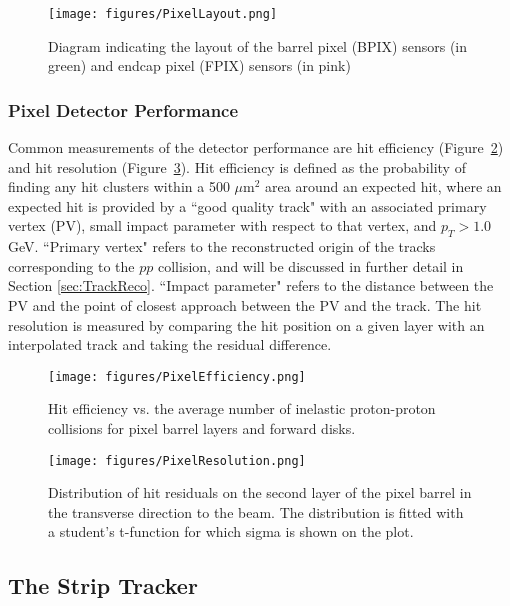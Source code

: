 \begin{figure}\centering
  \texttt{[image: figures/PixelLayout.png]}
  \caption{\label{fig:PixelLayout} Diagram indicating the layout of the barrel pixel (BPIX) sensors (in green) and endcap pixel (FPIX) sensors (in pink)}
\end{figure}

\subsubsection{Pixel Detector Performance}

Common measurements of the detector performance are hit efficiency (Figure~\ref{fig:PixelEfficiency}) and hit resolution (Figure~\ref{fig:PixelResolution}). Hit efficiency is defined as the probability of finding any hit clusters within a 500 $\mu$m$^2$ area around an expected hit, where an expected hit is provided by a ``good quality track" with an associated primary vertex (PV), small impact parameter with respect to that vertex, and $p_{T} > 1.0$ GeV. ``Primary vertex" refers to the reconstructed origin of the tracks corresponding to the $pp$ collision, and will be discussed in further detail in Section \ref{sec:TrackReco}. ``Impact parameter" refers to the distance between the PV and the point of closest approach between the PV and the track. The hit resolution is measured by comparing the hit position on a given layer with an interpolated track and taking the residual difference.\cite{PixelPerformance}

\begin{figure}\centering
  \texttt{[image: figures/PixelEfficiency.png]}
  \caption{\label{fig:PixelEfficiency} Hit efficiency vs. the average number of inelastic proton-proton collisions for pixel barrel layers and forward disks.}
\end{figure}

\begin{figure}\centering
  \texttt{[image: figures/PixelResolution.png]}
  \caption{\label{fig:PixelResolution} Distribution of hit residuals on the second layer of the pixel barrel in the transverse direction to the beam. The distribution is fitted with a student's t-function for which sigma is shown on the plot.}
\end{figure}

\subsection{The Strip Tracker}

